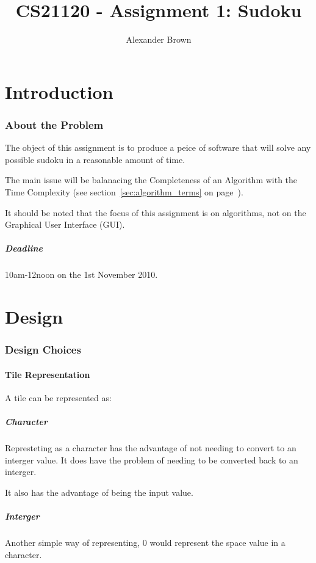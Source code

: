 \documentclass[10pt,letterpaper]{article}
\title{CS21120 - Assignment 1: Sudoku}
\author{Alexander Brown}
\begin{document}
  \maketitle
  \tableofcontents
  \newpage
  \part{Introduction}
    \section{About the Problem}
      The object of this assignment is to produce a peice of software that will solve any possible sudoku in a reasonable amount of time.
      
      The main issue will be balanacing the Completeness of an Algorithm with the Time Complexity (see section~\ref{sec:algorithm_terms} on page~\pageref{sec:algorithm_terms}).
      
      It should be noted that the focus of this assignment is on algorithms, not on the Graphical User Interface (GUI).
      
      \subsubsection{Deadline}
	10am-12noon on the 1st November 2010.
  
  \newpage
  \part{Design}
    \section{Design Choices}
      \subsection{Tile Representation}
	A tile can be represented as:
	
	\subsubsection{Character}
	  Represteting as a character has the advantage of not needing to convert to an interger value. It does have the problem of needing to be converted back to an interger.
	  
	  It also has the advantage of being the input value.
	
	\subsubsection{Interger}
	  Another simple way of representing, 0 would represent the space value in a character.
	  
\end{document}
